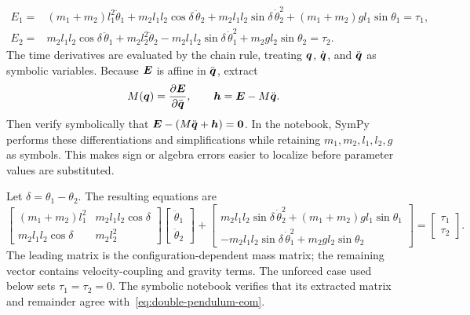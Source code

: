\documentclass[../main.tex]{subfiles}
\begin{document}
	\begin{equation}
	\begin{aligned}
	E_1={}&(m_1+m_2)l_1^2\ddot\theta_1
	+m_2l_1l_2\cos\delta\,\ddot\theta_2
	+m_2l_1l_2\sin\delta\,\dot\theta_2^2
	+(m_1+m_2)gl_1\sin\theta_1=\tau_1,\\
	E_2={}&m_2l_1l_2\cos\delta\,\ddot\theta_1
	+m_2l_2^2\ddot\theta_2
	-m_2l_1l_2\sin\delta\,\dot\theta_1^2
	+m_2gl_2\sin\theta_2=\tau_2.
	\end{aligned}
	\label{eq:double-pendulum-expanded-residuals}
	\end{equation}
	The time derivatives are evaluated by the chain rule, treating $\boldsymbol{q}$, $\dot{\boldsymbol{q}}$, and $\ddot{\boldsymbol{q}}$ as symbolic variables. Because $\boldsymbol{E}$ is affine in $\ddot{\boldsymbol{q}}$, extract
\begin{equation}
	M(\boldsymbol{q}) = \frac{\partial\boldsymbol{E}}{\partial\ddot{\boldsymbol{q}}},
	\qquad
	\boldsymbol{h} = \boldsymbol{E} - M\ddot{\boldsymbol{q}}.
	\label{eq:double-pendulum-symbolic-extraction}
\end{equation}
Then verify symbolically that $\boldsymbol{E}-(M\ddot{\boldsymbol{q}}+\boldsymbol{h})=\boldsymbol{0}$. In the notebook, SymPy performs these differentiations and simplifications while retaining $m_1,m_2,l_1,l_2,g$ as symbols. This makes sign or algebra errors easier to localize before parameter values are substituted.

Let $\delta=\theta_1-\theta_2$. The resulting equations are
\begin{equation}
	\begin{bmatrix}
		(m_1+m_2)l_1^2 & m_2l_1l_2\cos\delta\\
		m_2l_1l_2\cos\delta & m_2l_2^2
	\end{bmatrix}
	\begin{bmatrix}\ddot\theta_1\\\ddot\theta_2\end{bmatrix}
	+
	\begin{bmatrix}
		m_2l_1l_2\sin\delta\,\dot\theta_2^2+(m_1+m_2)gl_1\sin\theta_1\\
		-m_2l_1l_2\sin\delta\,\dot\theta_1^2+m_2gl_2\sin\theta_2
	\end{bmatrix}
	=
	\begin{bmatrix}\tau_1\\\tau_2\end{bmatrix}.
	\label{eq:double-pendulum-eom}
\end{equation}
The leading matrix is the configuration-dependent mass matrix; the remaining vector contains velocity-coupling and gravity terms. The unforced case used below sets $\tau_1=\tau_2=0$. The symbolic notebook verifies that its extracted matrix and remainder agree with~\eqref{eq:double-pendulum-eom}.
\end{document}
